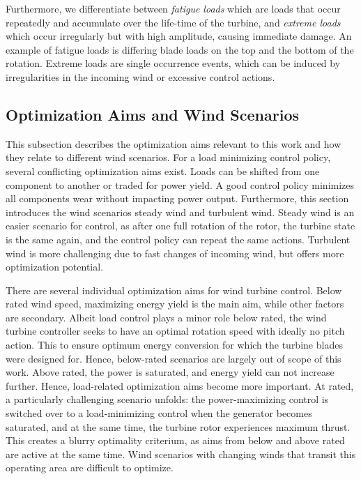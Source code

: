 Furthermore, we differentiate between \textit{fatigue loads} which are loads that occur repeatedly and accumulate over the life-time of the turbine, and \textit{extreme loads} which occur irregularly but with high amplitude, causing immediate damage. An example of fatigue loads is differing blade loads on the top and the bottom of the rotation. Extreme loads are single occurrence events, which can be induced by irregularities in the incoming wind or excessive control actions. \cite[Section 2.2]{perez-beckerAdvancedAerodynamicModeling2021}

\subsection{Optimization Aims and Wind Scenarios}
\label{section:background-optimization-aims}

\begin{summary}
This subsection describes the optimization aims relevant to this work and how they relate to different wind scenarios. For a load minimizing control policy, several conflicting optimization aims exist. Loads can be shifted from one component to another or traded for power yield. A good control policy minimizes all components wear without impacting power output. Furthermore, this section introduces the wind scenarios steady wind and turbulent wind. Steady wind is an easier scenario for control, as after one full rotation of the rotor, the turbine state is the same again, and the control policy can repeat the same actions. Turbulent wind is more challenging due to fast changes of incoming wind, but offers more optimization potential.
\end{summary}

There are several individual optimization aims for wind turbine control. Below rated wind speed, maximizing energy yield is the main aim, while other factors are secondary. Albeit load control plays a minor role below rated, the wind turbine controller seeks to have an optimal rotation speed with ideally no pitch action. This to ensure optimum energy conversion for which the turbine blades were designed for. Hence, below-rated scenarios are largely out of scope of this work. Above rated, the power is saturated, and energy yield can not increase further. Hence, load-related optimization aims become more important. At rated, a particularly challenging scenario unfolds: the power-maximizing control is switched over to a load-minimizing control when the generator becomes saturated, and at the same time, the turbine rotor experiences maximum thrust. This creates a blurry optimality criterium, as aims from below and above rated are active at the same time. Wind scenarios with changing winds that transit this operating area are difficult to optimize.

